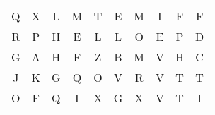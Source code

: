 \documentclass{standalone}
\begin{document}
\begin{center}
\renewcommand{\arraystretch}{1.5}{
\noindent\begin{tabular}{cccccccccc}Q & X & L & M & T & E & M & I & F & F \\ 
R & P & H & E & L & L & O & E & P & D \\ 
G & A & H & F & Z & B & M & V & H & C \\ 
J & K & G & Q & O & V & R & V & T & T \\ 
O & F & Q & I & X & G & X & V & T & I
\end{tabular}
}
\end{center}
\end{document}
